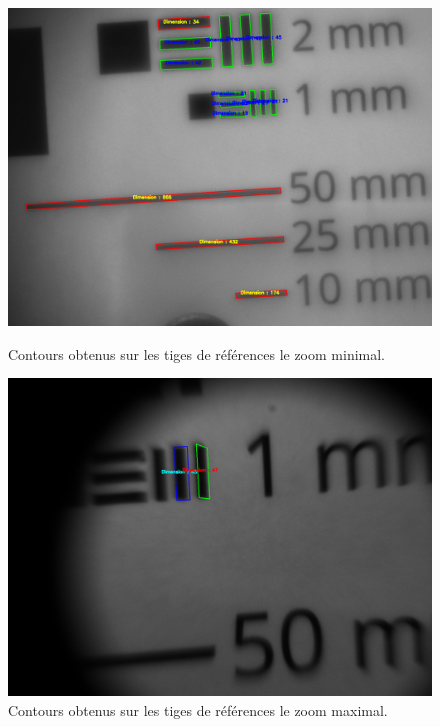 \documentclass[11pt,letterpaper]{article}
\begin{document}
\begin{figure}[h!]
    \centering
    \begin{minipage}[t]{0.46\linewidth}
        \centering
        \includegraphics[scale=0.17]{rectangles_detectes_min.png}
        \caption{Contours obtenus sur les tiges de références le zoom minimal.}
        \label{detec_min}
    \end{minipage}\hfill
    \begin{minipage}[t]{0.48\linewidth}
        \centering
        \includegraphics[scale=0.17]{rectangles_detectes_max.png}
        \caption{Contours obtenus sur les tiges de références le zoom maximal.}
        \label{detec_max}
    \end{minipage}
\end{figure}
\end{document}
